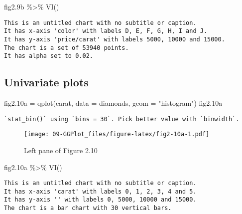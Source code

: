 \documentclass[
]{book}
\newenvironment{Shaded}{\begin{snugshade}}{\end{snugshade}}
\newcommand{\AttributeTok}[1]{\textcolor[rgb]{0.77,0.63,0.00}{#1}}
\newcommand{\FloatTok}[1]{\textcolor[rgb]{0.00,0.00,0.81}{#1}}
\newcommand{\FunctionTok}[1]{\textcolor[rgb]{0.00,0.00,0.00}{#1}}
\newcommand{\NormalTok}[1]{#1}
\newcommand{\OtherTok}[1]{\textcolor[rgb]{0.56,0.35,0.01}{#1}}
\newcommand{\SpecialCharTok}[1]{\textcolor[rgb]{0.00,0.00,0.00}{#1}}
\newcommand{\StringTok}[1]{\textcolor[rgb]{0.31,0.60,0.02}{#1}}
\begin{document}
\begin{Shaded}
\begin{Highlighting}[]
\NormalTok{fig2}\FloatTok{.9}\NormalTok{b }\SpecialCharTok{\%\textgreater{}\%} \FunctionTok{VI}\NormalTok{()   }
\end{Highlighting}
\end{Shaded}

\begin{verbatim}
This is an untitled chart with no subtitle or caption.
It has x-axis 'color' with labels D, E, F, G, H, I and J.
It has y-axis 'price/carat' with labels 5000, 10000 and 15000.
The chart is a set of 53940 points.
It has alpha set to 0.02.
\end{verbatim}

\hypertarget{univariate-plots}{%
\subsection{Univariate plots}\label{univariate-plots}}

\begin{Shaded}
\begin{Highlighting}[]
\NormalTok{fig2}\FloatTok{.10}\NormalTok{a }\OtherTok{=} \FunctionTok{qplot}\NormalTok{(carat, }\AttributeTok{data =}\NormalTok{ diamonds, }\AttributeTok{geom =} \StringTok{"histogram"}\NormalTok{)    }
\NormalTok{fig2}\FloatTok{.10}\NormalTok{a}
\end{Highlighting}
\end{Shaded}

\begin{verbatim}
`stat_bin()` using `bins = 30`. Pick better value with `binwidth`.
\end{verbatim}

\begin{figure}
\centering
\texttt{[image: 09-GGPlot\_files/figure-latex/fig2-10a-1.pdf]}
\caption{\label{fig:fig2-10a}Left pane of Figure 2.10}
\end{figure}

\begin{Shaded}
\begin{Highlighting}[]
\NormalTok{fig2}\FloatTok{.10}\NormalTok{a }\SpecialCharTok{\%\textgreater{}\%} \FunctionTok{VI}\NormalTok{()   }
\end{Highlighting}
\end{Shaded}

\begin{verbatim}
This is an untitled chart with no subtitle or caption.
It has x-axis 'carat' with labels 0, 1, 2, 3, 4 and 5.
It has y-axis '' with labels 0, 5000, 10000 and 15000.
The chart is a bar chart with 30 vertical bars.
\end{verbatim}
\end{document}
